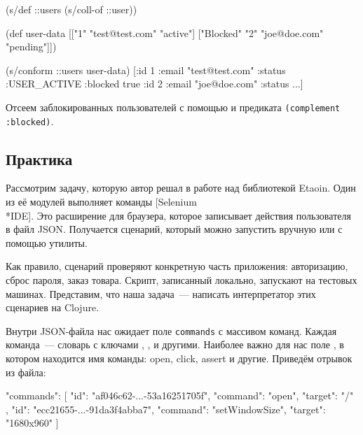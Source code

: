\else

\begin{clojure}
(s/def ::users (s/coll-of ::user))

(def user-data
  [["1" "test@test.com" "active"]
   ["Blocked" "2" "joe@doe.com" "pending"]])

(s/conform ::users user-data)
[{:id 1 :email "test@test.com" :status :USER_ACTIVE}
 {:blocked true :id 2 :email "joe@doe.com" :status ...}]
\end{clojure}

\fi


Отсеем заблокированных пользователей с помощью  и предиката
\texttt{(complement :blo\-cked)}.

\subsection{Практика}


\label{selenium-ide}

Рассмотрим задачу, которую автор решал в работе над библиотекой Etaoin. Один из
её модулей выполняет команды [Selenium\\*IDE].
Это расширение для браузера, которое записывает действия пользователя в файл
JSON. Получается сценарий, который можно запустить вручную или с помощью
утилиты.

Как правило, сценарий проверяют конкретную часть приложения: авторизацию, сброс
пароля, заказ товара. Скрипт, записанный локально, запускают на тестовых
машинах. Представим, что наша задача~--- написать интерпретатор этих сценариев
на Clojure.

Внутри JSON-файла нас ожидает поле \texttt{com\-mands} с массивом команд. Каждая
команда~--- словарь с ключами , ,  и
другими. Наиболее важно для нас поле , в котором находится имя
команды: open, click, assert и другие. Приведём отрывок из файла:

\begin{json}
"commands": [{
  "id": "af046c62-...-53a16251705f",
  "command": "open",
  "target": "/"
}, {
  "id": "ecc21655-...-91da3f4abba7",
  "command": "setWindowSize",
  "target": "1680x960"
}]
\end{json}


